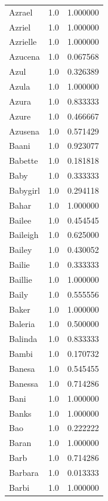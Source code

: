 \documentclass[
  letterpaper,
  DIV=11,
  numbers=noendperiod]{scrreprt}
\begin{document}
\begin{tabular}{lrr}
Azrael          &   1.0 &   1.000000 \\
Azriel          &   1.0 &   1.000000 \\
Azrielle        &   1.0 &   1.000000 \\
Azucena         &   1.0 &   0.067568 \\
Azul            &   1.0 &   0.326389 \\
Azula           &   1.0 &   1.000000 \\
Azura           &   1.0 &   0.833333 \\
Azure           &   1.0 &   0.466667 \\
Azusena         &   1.0 &   0.571429 \\
Baani           &   1.0 &   0.923077 \\
Babette         &   1.0 &   0.181818 \\
Baby            &   1.0 &   0.333333 \\
Babygirl        &   1.0 &   0.294118 \\
Bahar           &   1.0 &   1.000000 \\
Bailee          &   1.0 &   0.454545 \\
Baileigh        &   1.0 &   0.625000 \\
Bailey          &   1.0 &   0.430052 \\
Bailie          &   1.0 &   0.333333 \\
Baillie         &   1.0 &   1.000000 \\
Baily           &   1.0 &   0.555556 \\
Baker           &   1.0 &   1.000000 \\
Baleria         &   1.0 &   0.500000 \\
Balinda         &   1.0 &   0.833333 \\
Bambi           &   1.0 &   0.170732 \\
Banesa          &   1.0 &   0.545455 \\
Banessa         &   1.0 &   0.714286 \\
Bani            &   1.0 &   1.000000 \\
Banks           &   1.0 &   1.000000 \\
Bao             &   1.0 &   0.222222 \\
Baran           &   1.0 &   1.000000 \\
Barb            &   1.0 &   0.714286 \\
Barbara         &   1.0 &   0.013333 \\
Barbi           &   1.0 &   1.000000 \\

\end{tabular}
\end{document}
